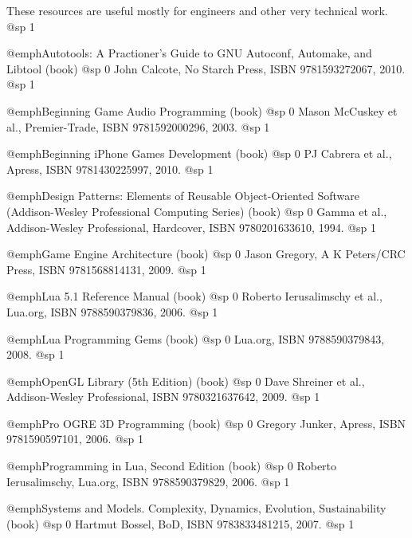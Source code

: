
These resources are useful mostly for engineers and other very technical work.
@sp 1
\itemize

\item
@emph{Autotools: A Practioner's Guide to GNU Autoconf, Automake, and Libtool} (book)
@sp 0
John Calcote, No Starch Press, ISBN 9781593272067, 2010.
@sp 1

\item
@emph{Beginning Game Audio Programming} (book)
@sp 0
Mason McCuskey et al., Premier-Trade, ISBN 9781592000296, 2003.
@sp 1

\item
@emph{Beginning iPhone Games Development} (book)
@sp 0
PJ Cabrera et al., Apress, ISBN 9781430225997, 2010.
@sp 1

\item
@emph{Design Patterns: Elements of Reusable Object-Oriented Software (Addison-Wesley Professional Computing Series)} (book)
@sp 0
Gamma et al., Addison-Wesley Professional, Hardcover, ISBN 9780201633610, 1994.
@sp 1

\item
@emph{Game Engine Architecture} (book)
@sp 0
Jason Gregory, A K Peters/CRC Press, ISBN 9781568814131, 2009.
@sp 1

\item
@emph{Lua 5.1 Reference Manual} (book)
@sp 0
Roberto Ierusalimschy et al., Lua.org, ISBN 9788590379836, 2006.
@sp 1

\item
@emph{Lua Programming Gems} (book)
@sp 0
Lua.org, ISBN 9788590379843, 2008.
@sp 1

\item
@emph{OpenGL Library (5th Edition)} (book)
@sp 0
Dave Shreiner et al., Addison-Wesley Professional, ISBN 9780321637642, 2009.
@sp 1

\item
@emph{Pro OGRE 3D Programming} (book)
@sp 0
Gregory Junker, Apress, ISBN 9781590597101, 2006.
@sp 1

\item
@emph{Programming in Lua, Second Edition} (book)
@sp 0
Roberto Ierusalimschy, Lua.org, ISBN 9788590379829, 2006.
@sp 1

\item
@emph{Systems and Models. Complexity, Dynamics, Evolution, Sustainability} (book)
@sp 0
Hartmut Bossel, BoD, ISBN 9783833481215, 2007.
@sp 1

